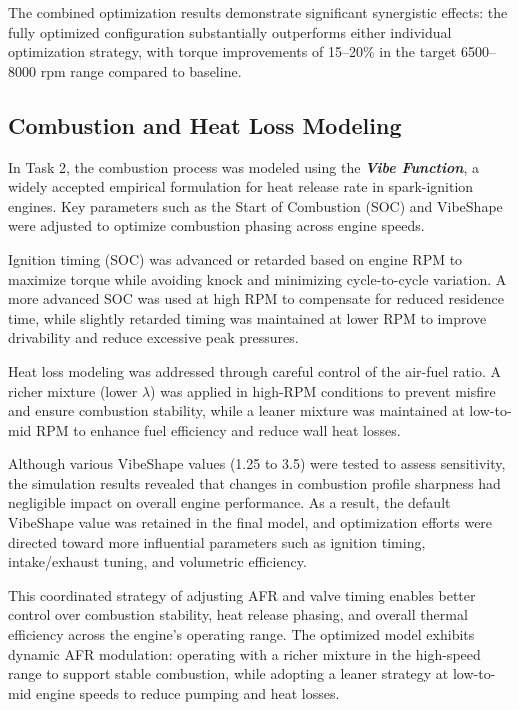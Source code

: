 The combined optimization results demonstrate significant synergistic effects: the fully optimized configuration substantially outperforms either individual optimization strategy, with torque improvements of 15--20\% in the target 6500--8000 rpm range compared to baseline.

\subsection{Combustion and Heat Loss Modeling}

In Task 2, the combustion process was modeled using the \textbf{\textit{Vibe Function}}, a widely accepted empirical formulation for heat release rate in spark-ignition engines. Key parameters such as the Start of Combustion (SOC) and VibeShape were adjusted to optimize combustion phasing across engine speeds.

Ignition timing (SOC) was advanced or retarded based on engine RPM to maximize torque while avoiding knock and minimizing cycle-to-cycle variation. A more advanced SOC was used at high RPM to compensate for reduced residence time, while slightly retarded timing was maintained at lower RPM to improve drivability and reduce excessive peak pressures.

Heat loss modeling was addressed through careful control of the air-fuel ratio. A richer mixture (lower $\lambda$) was applied in high-RPM conditions to prevent misfire and ensure combustion stability, while a leaner mixture was maintained at low-to-mid RPM to enhance fuel efficiency and reduce wall heat losses.

Although various VibeShape values (1.25 to 3.5) were tested to assess sensitivity, the simulation results revealed that changes in combustion profile sharpness had negligible impact on overall engine performance. As a result, the default VibeShape value was retained in the final model, and optimization efforts were directed toward more influential parameters such as ignition timing, intake/exhaust tuning, and volumetric efficiency.

This coordinated strategy of adjusting AFR and valve timing enables better control over combustion stability, heat release phasing, and overall thermal efficiency across the engine's operating range. The optimized model exhibits dynamic AFR modulation: operating with a richer mixture in the high-speed range to support stable combustion, while adopting a leaner strategy at low-to-mid engine speeds to reduce pumping and heat losses.

